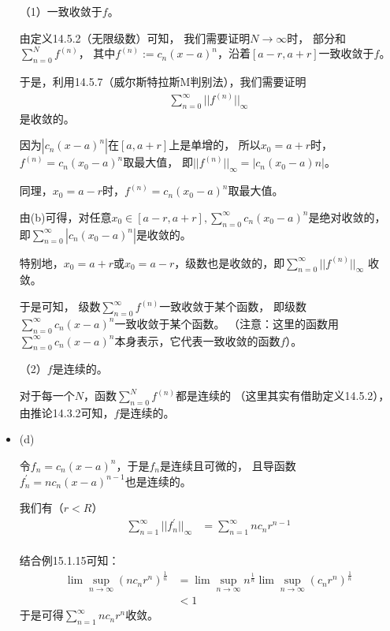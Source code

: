 \documentclass{article}
\begin{document}
\begin{itemize}
        （1）一致收敛于$f$。

        由定义14.5.2（无限级数）可知，
        我们需要证明$N \to \infty$时，
        部分和$\sum\limits_{n = 0}^N f^{(n)}$，
        其中$f^{(n)} := c_n(x - a)^n$，沿着$[a -r, a + r]$一致收敛于$f$。

        于是，利用14.5.7（威尔斯特拉斯M判别法），我们需要证明
        \begin{align*}
          \sum\limits_{n = 0}^\infty ||f^{(n)}||_\infty
        \end{align*}
        是收敛的。

        因为$|c_n(x - a)^n|$在$[a, a+r]$上是单增的，
        所以$x_0 = a + r$时，$f^{(n)} = c_n(x_0 - a)^n$取最大值，
        即$||f^{(n)}||_\infty = |c_n(x_0 − a)n|$。

        同理，$x_0 = a - r$时，$f^{(n)} = c_n(x_0 - a)^n$取最大值。

        由(b)可得，对任意$x_0 \in [a - r, a + r], \sum\limits_{n = 0}^\infty c_n(x_0 - a)^n$是绝对收敛的，
        即$\sum\limits_{n = 0}^\infty |c_n(x_0 - a)^n|$是收敛的。

        特别地，$x_0 = a + r$或$x_0 = a - r$，级数也是收敛的，即$\sum\limits_{n = 0}^\infty ||f^{(n)}||_\infty$
        收敛。

        于是可知，
        级数$\sum\limits_{n = 0}^\infty f^{(n)}$一致收敛于某个函数，
        即级数$\sum\limits_{n = 0}^\infty c_n(x - a)^n$一致收敛于某个函数。
        （注意：这里的函数用$\sum\limits_{n = 0}^\infty c_n(x - a)^n$本身表示，它代表一致收敛的函数$f$）。


        （2）$f$是连续的。

        对于每一个$N$，函数$\sum\limits_{n = 0}^N f^{(n)}$都是连续的
        （这里其实有借助定义14.5.2），由推论14.3.2可知，$f$是连续的。

  \item (d)

        令$f_n = c_n(x - a)^n$，于是$f_n$是连续且可微的，
        且导函数$f_n^\prime = nc_n(x - a)^{n - 1}$也是连续的。

        我们有（$r < R$）
        \begin{align*}
          \sum\limits_{n = 1}^\infty ||f_n^\prime||_\infty
           & = \sum\limits_{n = 1}^\infty nc_nr^{n - 1} \\
        \end{align*}

        结合例15.1.15可知：
        \begin{align*}
          \lim\sup\limits_{n \to \infty} (nc_nr^n)^\frac{1}{n}
           & = \lim\sup\limits_{n \to \infty} n^\frac{1}{n} \lim\sup\limits_{n \to \infty} (c_nr^n)^\frac{1}{n} \\
           & < 1
        \end{align*}
        于是可得$\sum\limits_{n = 1}^\infty nc_nr^n$收敛。


\end{itemize}
\end{document}
